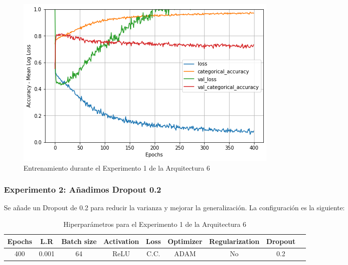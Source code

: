 \documentclass{article}
\begin{document}
            \begin{figure}[!h]
				\begin{center}
					\includegraphics[scale=0.5]{b-tr-a6-e1.png}		
					\caption{Entrenamiento durante el Experimento 1 de la Arquitectura 6}	
					\label{tab:tr-a6-e1}
				\end{center}
			\end{figure}
   
        \subsubsection{Experimento 2: A\~{n}adimos Dropout 0.2}
        \label{s-a6-e2}
            Se a\~{n}ade un Dropout de 0.2 para reducir la varianza y mejorar la generalizaci\'on. La configuraci\'on es la siguiente: 
   
            \begin{table}[!h]
				\begin{tabular}{|c|c|c|c|c|c|c|c|c|}
					\textbf{Epochs}&\textbf{L.R}&\textbf{Batch size}&\textbf{Activation}&\textbf{Loss}&\textbf{Optimizer}&\textbf{Regularization}&\textbf{Dropout}   \\ \hline
					400 & 0.001 & 64 & ReLU & C.C. & ADAM & No & 0.2 
				\end{tabular}
				\caption{Hiperpar\'ametros para el Experimento 1 de la Arquitectura 6}
				\label{tab:hip-a6-e2}
			\end{table}
   
\end{document}
